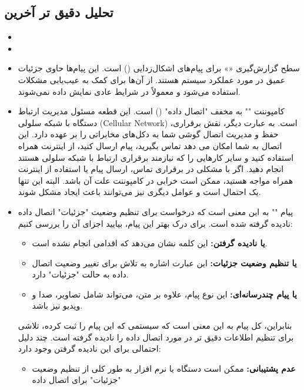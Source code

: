 \documentclass[landscape, 12pt]{report}
\begin{document}
\subsection*{تحلیل دقیق تر آخرین
}
\begin{itemize}
	\item {}
	\item {}
	\item  سطح گزارش‌گیری
	 «»
	  برای پیام‌های اشکال‌زدایی () است. این پیام‌ها حاوی جزئیات عمیق در مورد عملکرد سیستم هستند. از آن‌ها برای کمک به عیب‌یابی مشکلات استفاده می‌شود و معمولاً در شرایط عادی نمایش داده نمی‌شوند.
	  \item 
	  کامپوننت 
	 ""
	   به مخفف "اتصال داده" 
	   () 
	   است. این قطعه مسئول مدیریت ارتباط دستگاه با شبکه سلولی ({Cellular Network}\lr) است.
	  به عبارت دیگر، 
	   نقش برقراری، حفظ و مدیریت اتصال گوشی شما به دکل‌های مخابراتی را بر عهده دارد. این اتصال به شما امکان می دهد تماس بگیرید، پیام ارسال کنید، از اینترنت همراه استفاده کنید و سایر کارهایی را که نیازمند برقراری ارتباط با شبکه سلولی هستند انجام دهید.
	  اگر با مشکلی در برقراری تماس، ارسال پیام یا استفاده از اینترنت همراه مواجه هستید، ممکن است خرابی در کامپوننت
	    علت آن باشد. البته این تنها یک احتمال است و عوامل دیگری نیز می‌توانند باعث ایجاد مشکل شوند.
	  \item 
	  پیام 
	  ""
	   به این معنی است که درخواست برای تنظیم وضعیت "جزئیات" اتصال داده
	    نادیده گرفته شده است. برای درک بهتر این پیام، بیایید اجزای آن را بررسی کنیم:
	 \begin{itemize}
	 	\item \textbf{
	 	یا نادیده گرفتن:}  این کلمه نشان می‌دهد که اقدامی انجام نشده است.
	 	\item 
	\textbf{
	یا تنظیم وضعیت جزئیات:} این عبارت اشاره به تلاش برای تغییر وضعیت اتصال داده 
	به حالت "جزئیات" دارد.
	\item
\textbf{
یا پیام چندرسانه‌ای:} این نوع پیام، علاوه بر متن، می‌تواند شامل تصاویر، صدا و ویدیو نیز باشد.
	 \end{itemize}
	  بنابراین، کل پیام به این معنی است که سیستمی که این پیام را ثبت کرده، تلاشی برای تنظیم اطلاعات دقیق تر در مورد اتصال داده
	    را نادیده گرفته است.
	  چند دلیل احتمالی برای این نادیده گرفتن وجود دارد:
	  \begin{itemize}
	  	 \item 
	  	 \textbf{عدم پشتیبانی:} ممکن است دستگاه یا نرم افزار به طور کلی از تنظیم وضعیت "جزئیات" برای اتصال داده 

\end{itemize}
\end{itemize}
\end{document}
